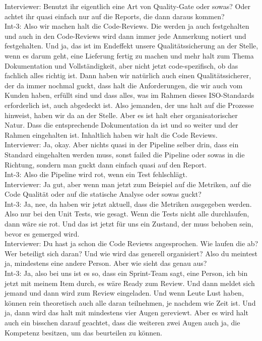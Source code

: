 Interviewer: Benutzt ihr eigentlich eine Art von Quality-Gate oder sowas? Oder achtet ihr quasi einfach nur auf die Reports, die dann daraus kommen? \\
Int-3: Also wir machen halt die Code-Reviews. Die werden ja auch festgehalten und auch in den Code-Reviews wird dann immer jede Anmerkung notiert und festgehalten. Und ja, das ist im Endeffekt unsere Qualitätssicherung an der Stelle, wenn es darum geht, eine Lieferung fertig zu machen und mehr halt zum Thema Dokumentation und Vollständigkeit, aber nicht jetzt code-spezifisch, ob das fachlich alles richtig ist. Dann haben wir natürlich auch einen Qualitätssicherer, der da immer nochmal guckt, dass halt die Anforderungen, die wir auch vom Kunden haben, erfüllt sind und dass alles, was im Rahmen dieses ISO-Standards erforderlich ist, auch abgedeckt ist. Also jemanden, der uns halt auf die Prozesse hinweist, haben wir da an der Stelle. Aber es ist halt eher organisatorischer Natur. Dass die entsprechende Dokumentation da ist und so weiter und der Rahmen eingehalten ist. Inhaltlich haben wir halt die Code Reviews. \\
Interviewer: Ja, okay. Aber nichts quasi in der Pipeline selber drin, dass ein Standard eingehalten werden muss, sonst failed die Pipeline oder sowas in die Richtung, sondern man guckt dann einfach quasi auf den Report. \\
Int-3: Also die Pipeline wird rot, wenn ein Test fehlschlägt. \\
Interviewer: Ja gut, aber wenn man jetzt zum Beispiel auf die Metriken, auf die Code Qualität oder auf die statische Analyse oder sowas guckt?\\
Int-3: Ja, nee, da haben wir jetzt aktuell, dass die Metriken ausgegeben werden. Also nur bei den Unit Tests, wie gesagt. Wenn die Tests nicht alle durchlaufen, dann wäre sie rot. Und das ist jetzt für uns ein Zustand, der muss behoben sein, bevor es gemerged wird. \\
Interviewer: Du hast ja schon die Code Reviews angesprochen. Wie laufen die ab? Wer beteiligt sich daran? Und wie wird das generell organisiert? Also du meintest ja, mindestens eine andere Person. Aber wie sieht das genau aus? \\
Int-3: Ja, also bei uns ist es so, dass ein Sprint-Team sagt, eine Person, ich bin jetzt mit meinem Item durch, es wäre Ready zum Review. Und dann meldet sich jemand und dann wird zum Review eingeladen. Und wenn Leute Lust haben, können rein theoretisch auch alle daran teilnehmen, je nachdem wie Zeit ist. Und ja, dann wird das halt mit mindestens vier Augen gereviewt. Aber es wird halt auch ein bisschen darauf geachtet, dass die weiteren zwei Augen auch ja, die Kompetenz besitzen, um das beurteilen zu können. \\
